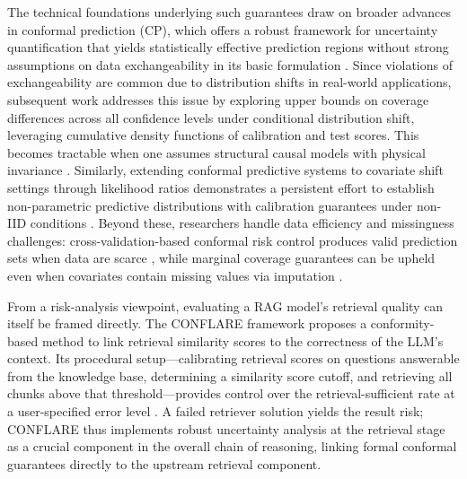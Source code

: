 \documentclass[11pt]{article}
\begin{document}
The technical foundations underlying such guarantees draw on broader advances in conformal prediction (CP), which offers a robust framework for uncertainty quantification that yields statistically effective prediction regions without strong assumptions on data exchangeability in its basic formulation \cite{ref136}. Since violations of exchangeability are common due to distribution shifts in real-world applications, subsequent work addresses this issue by exploring upper bounds on coverage differences across all confidence levels under conditional distribution shift, leveraging cumulative density functions of calibration and test scores. This becomes tractable when one assumes structural causal models with physical invariance \cite{ref137}. Similarly, extending conformal predictive systems to covariate shift settings through likelihood ratios demonstrates a persistent effort to establish non-parametric predictive distributions with calibration guarantees under non-IID conditions \cite{ref138}. Beyond these, researchers handle data efficiency and missingness challenges: cross-validation-based conformal risk control produces valid prediction sets when data are scarce \cite{ref139}, while marginal coverage guarantees can be upheld even when covariates contain missing values via imputation \cite{ref136}.

From a risk-analysis viewpoint, evaluating a RAG model's retrieval quality can itself be framed directly. The CONFLARE framework proposes a conformity-based method to link retrieval similarity scores to the correctness of the LLM's context. Its procedural setup---calibrating retrieval scores on questions answerable from the knowledge base, determining a similarity score cutoff, and retrieving all chunks above that threshold---provides control over the retrieval-sufficient rate at a user-specified error level \cite{ref47}. A failed retriever solution yields the result risk; CONFLARE thus implements robust uncertainty analysis at the retrieval stage as a crucial component in the overall chain of reasoning, linking formal conformal guarantees directly to the upstream retrieval component.
\end{document}
